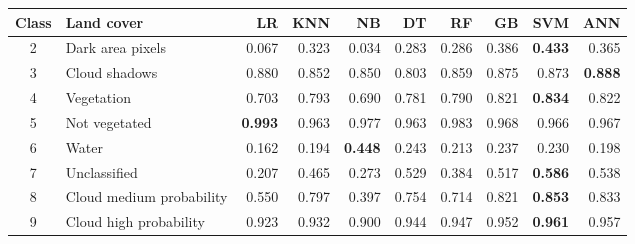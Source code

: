 \begin{tabular}{clrrrrrrrr}
\toprule
Class & Land cover & LR & KNN & NB & DT & RF & GB & SVM & ANN \\
\midrule
2 & Dark area pixels & 0.067 & 0.323 & 0.034 & 0.283 & 0.286 & 0.386 & \textbf{0.433} & 0.365 \\
3 & Cloud shadows & 0.880 & 0.852 & 0.850 & 0.803 & 0.859 & 0.875 & 0.873 & \textbf{0.888} \\
4 & Vegetation & 0.703 & 0.793 & 0.690 & 0.781 & 0.790 & 0.821 & \textbf{0.834} & 0.822 \\
5 & Not vegetated & \textbf{0.993} & 0.963 & 0.977 & 0.963 & 0.983 & 0.968 & 0.966 & 0.967 \\
6 & Water & 0.162 & 0.194 & \textbf{0.448} & 0.243 & 0.213 & 0.237 & 0.230 & 0.198 \\
7 & Unclassified & 0.207 & 0.465 & 0.273 & 0.529 & 0.384 & 0.517 & \textbf{0.586} & 0.538 \\
8 & Cloud medium probability & 0.550 & 0.797 & 0.397 & 0.754 & 0.714 & 0.821 & \textbf{0.853} & 0.833 \\
9 & Cloud high probability & 0.923 & 0.932 & 0.900 & 0.944 & 0.947 & 0.952 & \textbf{0.961} & 0.957 \\
\bottomrule
\end{tabular}

